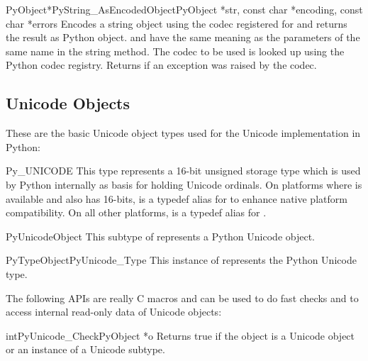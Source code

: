 \begin{cfuncdesc}{PyObject*}{PyString_AsEncodedObject}{PyObject *str,
                                               const char *encoding,
                                               const char *errors}
  Encodes a string object using the codec registered for
   and returns the result as Python object.
   and  have the same meaning as the
  parameters of the same name in the string  method.
  The codec to be used is looked up using the Python codec registry.
  Returns \NULL{} if an exception was raised by the codec.
\end{cfuncdesc}


\subsection{Unicode Objects \label{unicodeObjects}}


These are the basic Unicode object types used for the Unicode
implementation in Python:

\begin{ctypedesc}{Py_UNICODE}
  This type represents a 16-bit unsigned storage type which is used by
  Python internally as basis for holding Unicode ordinals.  On
  platforms where  is available and also has 16-bits,
   is a typedef alias for  to enhance
  native platform compatibility.  On all other platforms,
   is a typedef alias for .
\end{ctypedesc}

\begin{ctypedesc}{PyUnicodeObject}
  This subtype of  represents a Python Unicode object.
\end{ctypedesc}

\begin{cvardesc}{PyTypeObject}{PyUnicode_Type}
  This instance of  represents the Python Unicode
  type.
\end{cvardesc}

The following APIs are really C macros and can be used to do fast
checks and to access internal read-only data of Unicode objects:

\begin{cfuncdesc}{int}{PyUnicode_Check}{PyObject *o}
  Returns true if the object  is a Unicode object or an
  instance of a Unicode subtype.
\end{cfuncdesc}

